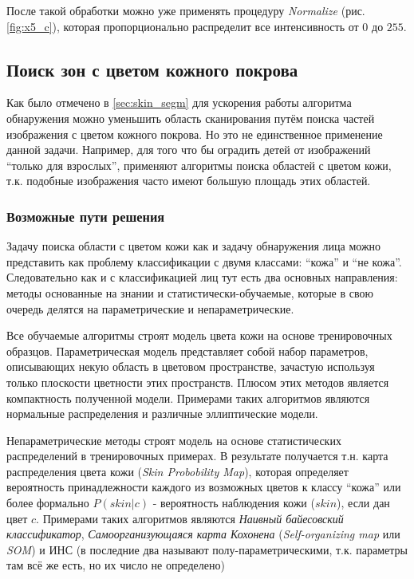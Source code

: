 \documentclass[12pt]{report}
\begin{document}
\begin{figure}[h]
	\centering
	\caption{}
	\label{fig:aggresive_normal_steps}
\end{figure}

После такой обработки можно уже применять процедуру \textit{Normalize} (рис. \ref{fig:x5_c}), которая 
пропорционально 
распределит все интенсивность от $0$ до $255$.

\subsection{Поиск зон с цветом кожного покрова}
\label{sec:skin_detection}
Как было отмечено в \ref{sec:skin_segm} для ускорения работы алгоритма обнаружения можно уменьшить область 
сканирования путём поиска частей изображения с цветом кожного покрова. Но это не единственное применение данной задачи. Например, 
для того что бы оградить детей от изображений ``только для взрослых'', применяют алгоритмы поиска областей с цветом 
кожи, т.к. подобные изображения часто имеют большую площадь этих областей. \citep{forsyth1999automatic} \citep
{zheng2004blocking}

\subsubsection{Возможные пути решения}
Задачу поиска области с цветом кожи как и задачу обнаружения лица можно представить как проблему классификации с 
двумя классами: ``кожа'' и ``не кожа''. Следовательно как и с классификацией лиц тут есть два основных направления: 
методы основанные на знании и статистически-обучаемые, которые в свою очередь делятся на параметрические и 
непараметрические. \citep{vezhnevets2003survey}

Все обучаемые алгоритмы строят модель цвета кожи на основе тренировочных образцов. Параметрическая модель 
представляет собой набор параметров, описывающих некую область в цветовом пространстве, зачастую используя только 
плоскости цветности этих пространств. Плюсом этих методов является компактность полученной модели. Примерами таких 
алгоритмов являются нормальные распределения и различные эллиптические модели.

Непараметрические методы строят модель на основе статистических распределений в тренировочных примерах. В 
результате 
получается т.н. карта распределения цвета кожи (\textit{Skin Probobility Map}), которая определяет вероятность 
принадлежности каждого из возможных цветов к классу ``кожа'' или более формально $P(skin|c)$ - вероятность наблюдения 
кожи ($skin$), если дан цвет $c$. Примерами таких алгоритмов являются \emph{Наивный байесовский классификатор}, 
\emph
{Самоорганизующаяся карта Кохонена} (\textit{Self-organizing map} или \textit{SOM}) и ИНС (в \citep{xu2006color} 
последние два называют полу-параметрическими, т.к. параметры там всё же есть, но их число не определено)
\end{document}
